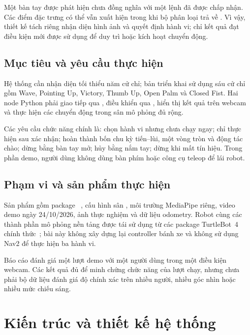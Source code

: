 \documentclass[12pt,a4paper]{article}
\newcommand{\code}[1]{\texttt{\detokenize{#1}}}
\begin{document}
Một bàn tay được phát hiện chưa đồng nghĩa với một lệnh đã được chấp nhận. Các điểm đặc trưng có thể vẫn xuất hiện trong khi bộ phân loại trả về \code{None}. Vì vậy, thiết kế tách riêng nhận diện hình ảnh và quyết định hành vi; chỉ kết quả đạt điều kiện mới được sử dụng để duy trì hoặc kích hoạt chuyển động.

\subsection{Mục tiêu và yêu cầu thực hiện}
Hệ thống cần nhận diện tối thiểu năm cử chỉ; bản triển khai sử dụng sáu cử chỉ gồm Wave, Pointing Up, Victory, Thumb Up, Open Palm và Closed Fist. Hai node Python phải giao tiếp qua , điều khiển qua , hiển thị kết quả trên webcam và thực hiện các chuyển động trong sân mô phỏng đủ rộng.

Các yêu cầu chức năng chính là: chọn hành vi nhưng chưa chạy ngay; chỉ thực hiện sau xác nhận; hoàn thành bốn chu kỳ tiến--lùi, một vòng tròn và động tác chào; dừng bằng bàn tay mở; hủy bằng nắm tay; dừng khi mất tín hiệu. Trong phần demo, người dùng không dùng bàn phím hoặc công cụ teleop để lái robot.

\subsection{Phạm vi và sản phẩm thực hiện}
Sản phẩm gồm package ~\cite{source}, cấu hình sân \code{gesture_arena}, môi trường MediaPipe riêng, video demo ngày 24/10/2026, ảnh thực nghiệm và dữ liệu odometry. Robot cùng các thành phần mô phỏng nền tảng được tái sử dụng từ các package TurtleBot~4 chính thức~\cite{tb4}; bài này không xây dựng lại controller bánh xe và không sử dụng Nav2 để thực hiện ba hành vi.

Báo cáo đánh giá một lượt demo với một người dùng trong một điều kiện webcam. Các kết quả đủ để minh chứng chức năng của lượt chạy, nhưng chưa phải bộ dữ liệu đánh giá độ chính xác trên nhiều người, nhiều góc nhìn hoặc nhiều mức chiếu sáng.

\section{Kiến trúc và thiết kế hệ thống}
\end{document}
